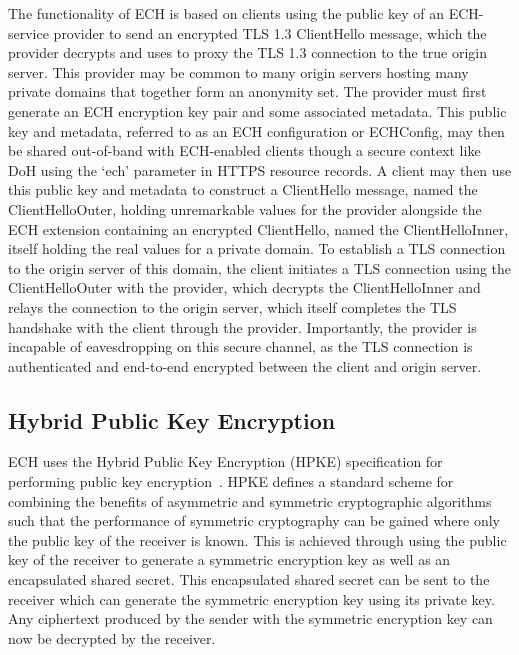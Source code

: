 The functionality of ECH is based on clients using the public key of an ECH-service provider to send an encrypted TLS 1.3 ClientHello message, which the provider decrypts and uses to proxy the TLS 1.3 connection to the true origin server. This provider may be common to many origin servers hosting many private domains that together form an anonymity set. The provider must first generate an ECH encryption key pair and some associated metadata. This public key and metadata, referred to as an ECH configuration or ECHConfig, may then be shared out-of-band with ECH-enabled clients though a secure context like DoH using the `ech' parameter in HTTPS resource records. A client may then use this public key and metadata to construct a ClientHello message, named the ClientHelloOuter, holding unremarkable values for the provider alongside the ECH extension containing an encrypted ClientHello, named the ClientHelloInner, itself holding the real values for a private domain. To establish a TLS connection to the origin server of this domain, the client initiates a TLS connection using the ClientHelloOuter with the provider, which decrypts the ClientHelloInner and relays the connection to the origin server, which itself completes the TLS handshake with the client through the provider. Importantly, the provider is incapable of eavesdropping on this secure channel, as the TLS connection is authenticated and end-to-end encrypted between the client and origin server.

\subsection{Hybrid Public Key Encryption}

ECH uses the Hybrid Public Key Encryption (HPKE) specification for performing public key encryption~\cite{rfc9180}. HPKE defines a standard scheme for combining the benefits of asymmetric and symmetric cryptographic algorithms such that the performance of symmetric cryptography can be gained where only the public key of the receiver is known. This is achieved through using the public key of the receiver to generate a symmetric encryption key as well as an encapsulated shared secret. This encapsulated shared secret can be sent to the receiver which can generate the symmetric encryption key using its private key. Any ciphertext produced by the sender with the symmetric encryption key can now be decrypted by the receiver.

